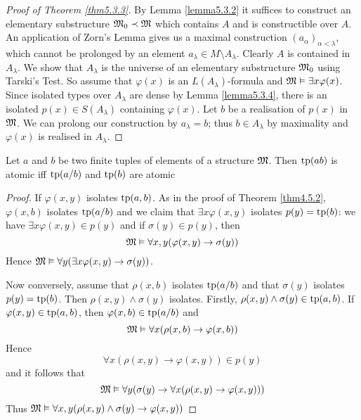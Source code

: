 \documentclass[11pt]{article}
\begin{document}
\begin{proof}[Proof of Theorem \ref{thm5.3.3}]
By Lemma \ref{lemma5.3.2} it suffices to construct an elementary substructure \(\mathfrak{M}_0\prec\mathfrak{M}\) which
contains \(A\) and is constructible over \(A\). An application of Zorn's Lemma gives us a
maximal construction \((a_\alpha)_{\alpha<\lambda}\), which cannot be prolonged by an element \(a_\lambda\in M\setminus A_\lambda\).
Clearly \(A\) is contained in \(A_\lambda\). We show that \(A_\lambda\) is the universe of an elementary
substructure \(\mathfrak{M}_0\) using Tarski's Test. So assume that \(\varphi(x)\) is an \(L(A_\lambda)\)-formula
and \(\mathfrak{M}\vDash\exists x\varphi(x)\). Since isolated types over \(A_\lambda\) are dense by Lemma \ref{lemma5.3.4}, there is
an isolated \(p(x)\in S(A_\lambda)\) containing \(\varphi(x)\). Let \(b\) be a realisation of \(p(x)\)
in \(\mathfrak{M}\). We can prolong our construction by \(a_\lambda=b\); thus \(b\in A_\lambda\) by maximality
and \(\varphi(x)\) is realised in \(A_\lambda\).
\end{proof}

\begin{lemma}[]
\label{lemma5.3.5}
Let \(a\) and \(b\) be two finite tuples of elements of a structure \(\mathfrak{M}\). Then \(\operatorname{tp}(ab)\) is
atomic iff \(\operatorname{tp}(a/b)\) and \(\operatorname{tp}(b)\) are atomic
\end{lemma}

\begin{proof}
If \(\varphi(x,y)\) isolates \(\operatorname{tp}(a,b)\). As in the proof of Theorem \ref{thm4.5.2}, \(\varphi(x,b)\)
isolates \(\operatorname{tp}(a/b)\) and we claim that \(\exists x\varphi(x,y)\) isolates \(p(y)=\operatorname{tp}(b)\): we
have \(\exists x\varphi(x,y)\in p(y)\) and if \(\sigma(y)\in p(y)\), then
\begin{equation*}
\mathfrak{M}\vDash\forall x,y(\varphi(x,y)\to\sigma(y))
\end{equation*}
Hence \(\mathfrak{M}\vDash\forall y(\exists x\varphi(x,y)\to\sigma(y))\).

Now conversely, assume that \(\rho(x,b)\) isolates \(\operatorname{tp}(a/b)\) and that \(\sigma(y)\)
isolates \(p(y)=\operatorname{tp}(b)\). Then \(\rho(x,y)\wedge\sigma(y)\) isolates. Firstly, \(\rho(x,y)\wedge\sigma(y)\in\operatorname{tp}(a,b)\).
If \(\varphi(x,y)\in\operatorname{tp}(a,b)\), then \(\varphi(x,b)\in\operatorname{tp}(a/b)\) and
\begin{equation*}
\mathfrak{M}\vDash\forall x(\rho(x,b)\to\varphi(x,b))
\end{equation*}
Hence
\begin{equation*}
\forall x(\rho(x,y)\to\varphi(x,y))\in p(y)
\end{equation*}
and it follows that
\begin{equation*}
\mathfrak{M}\vDash\forall y(\sigma(y)\to\forall x(\rho(x,y)\to\varphi(x,y)))
\end{equation*}
Thus \(\mathfrak{M}\vDash\forall x,y(\rho(x,y)\wedge\sigma(y)\to\varphi(x,y))\)
\end{proof}
\end{document}
